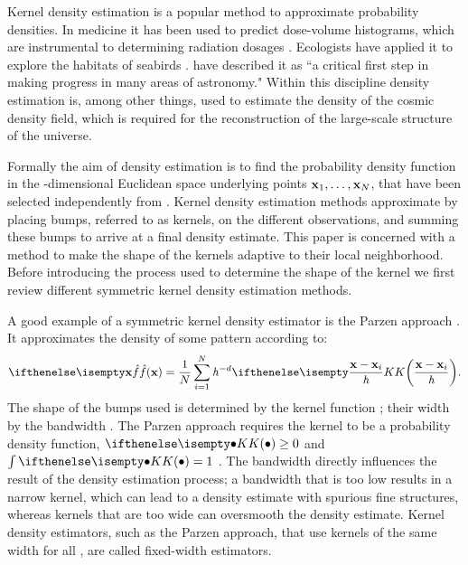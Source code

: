 Kernel density estimation is a popular method to approximate probability densities. In medicine it has been used to predict dose-volume histograms, which are instrumental to determining radiation dosages \cite{SkarpmanDose2015}. Ecologists have applied it to explore the habitats of seabirds \cite{lees2016using}. \textcite{ferdosi2011comparison} have described it as ``a critical first step in making progress in many areas of astronomy."  Within this discipline  density estimation is, among other things, used to estimate the density of the cosmic density field, which is required for the reconstruction of the large-scale structure of the universe.

Formally the aim of density estimation is to find the probability density function \varDensityFunction{\varPattern} in the \varDim-dimensional Euclidean space underlying \varNumPatterns points $\varPattern[1], \dotsc, \varPattern[\varNumPatterns]$, that have been selected independently from \varDensityFunction{\varPattern}. Kernel density estimation methods approximate \varDensityFunction{\varPattern} by placing bumps, referred to as kernels, on the different observations, and summing these bumps to arrive at a final density estimate. This paper is concerned with a method to make the shape of the kernels adaptive to their local neighborhood. Before introducing the process used to determine the shape of the kernel we first review different symmetric kernel density estimation methods.

	A good example of a symmetric kernel density estimator is the Parzen approach \cite{parzen1962estimation}. It approximates the density of some pattern \varPattern according to:
	\begin{equation}\label{eq:1:parzen}
		\varEstimatedDensityFunction{\varPattern} = \frac{1}{\varNumPatterns}\sum_{\itXis = 1}^{\varNumPatterns} \varBandwidth^{-\varDim}\varKernel{\frac{\varPattern - \varPattern[\itXis]}{\varBandwidth}}.
	\end{equation}
	The shape of the bumps used is determined by the kernel function \varKernel{\bullet}; their width by the bandwidth \varBandwidth. The Parzen approach requires the kernel to be a probability density function, \ie $\varKernel{\bullet} \geq 0$ and $\int \varKernel{\bullet} = 1$ \cite{silverman1986density}. 
	The bandwidth directly influences the result of the density estimation process; a bandwidth that is too low results in a narrow kernel, which can lead to a density estimate with spurious fine structures, whereas kernels that are too wide can oversmooth the density estimate. Kernel density estimators, such as the Parzen approach, that use kernels of the same width for all \varPattern[\itXis], are called fixed-width estimators.

